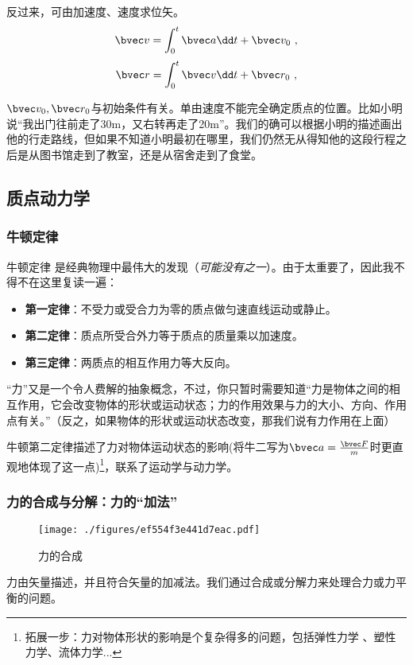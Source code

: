反过来，可由加速度、速度求位矢。
$$
\bvec v = \int^{t}_0\bvec a \dd t + \bvec v_0~,
$$
$$
\bvec r = \int^{t}_0\bvec v \dd t + \bvec r_0~,
$$

$\bvec v_0, \bvec r_0$与初始条件有关。单由速度不能完全确定质点的位置。比如小明说“我出门往前走了30m，又右转再走了20m”。我们的确可以根据小明的描述画出他的行走路线，但如果不知道小明最初在哪里，我们仍然无从得知他的这段行程之后是从图书馆走到了教室，还是从宿舍走到了食堂。

\subsection{质点动力学}

\subsubsection{牛顿定律}
牛顿定律 是经典物理中最伟大的发现（\textsl{可能没有之一}）。由于太重要了，因此我不得不在这里复读一遍：

\begin{itemize}
\item \textbf{第一定律}：不受力或受合力为零的质点做匀速直线运动或静止。
\item \textbf{第二定律}：质点所受合外力等于质点的质量乘以加速度。
\item \textbf{第三定律}：两质点的相互作用力等大反向。
\end{itemize}

“力”又是一个令人费解的抽象概念，不过，你只暂时需要知道“力是物体之间的相互作用，它会改变物体的形状或运动状态；力的作用效果与力的大小、方向、作用点有关。”（反之，如果物体的形状或运动状态改变，那我们说有力作用在上面）

牛顿第二定律描述了力对物体运动状态的影响(将牛二写为$\bvec a = \frac{\bvec F}{m}$时更直观地体现了这一点)\footnote{拓展一步：力对物体形状的影响是个复杂得多的问题，包括弹性力学 、塑性力学、流体力学...}，联系了运动学与动力学。

\subsubsection{力的合成与分解：力的“加法”}
\begin{figure}[ht]
\centering
\texttt{[image: ./figures/ef554f3e441d7eac.pdf]}
\caption{力的合成} \label{fig_MPAB_4}
\end{figure}
力由矢量描述，并且符合矢量的加减法。我们通过合成或分解力来处理合力或力平衡的问题。

